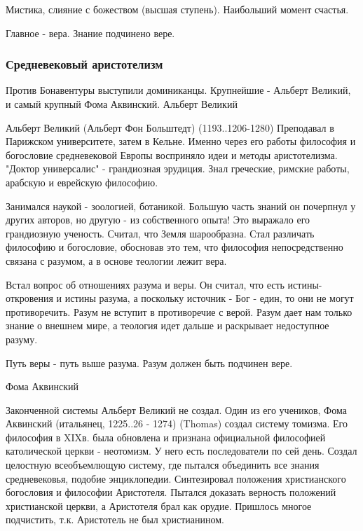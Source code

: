     Мистика, слияние с божеством (высшая ступень). Наибольший момент счастья.

    Главное - вера. Знание подчинено вере.

\subsubsection{Средневековый аристотелизм}

Против Бонавентуры выступили доминиканцы. Крупнейшие - Альберт Великий, и самый крупный Фома Аквинский.
Альберт Великий

Альберт Великий (Альберт Фон Больштедт) (1193..1206-1280) Преподавал в Парижском университете, затем в Кельне. Именно через его работы философия и богословие средневековой Европы восприняло идеи и методы аристотелизма. "Доктор универсалис" - грандиозная эрудиция. Знал греческие, римские работы, арабскую и еврейскую философию.

    Занимался наукой - зоологией, ботаникой. Большую часть знаний он почерпнул у других авторов, но другую - из собственного опыта! Это выражало его грандиозную ученость. Считал, что Земля шарообразна. Стал различать философию и богословие, обосновав это тем, что философия непосредственно связана с разумом, а в основе теологии лежит вера.

Встал вопрос об отношениях разума и веры. Он считал, что есть истины-откровения и истины разума, а поскольку источник - Бог - един, то они не могут противоречить. Разум не вступит в противоречие с верой. Разум дает нам только знание о внешнем мире, а теология идет дальше и раскрывает недоступное разуму.

    Путь веры - путь выше разума. Разум должен быть подчинен вере.

Фома Аквинский

Законченной системы Альберт Великий не создал. Один из его учеников, Фома Аквинский (итальянец, 1225..26 - 1274) (Thomas) создал систему томизма. Его философия в XIXв. была обновлена и признана официальной философией католической церкви - неотомизм. У него есть последователи по сей день. Создал целостную всеобъемлющую систему, где пытался объединить все знания средневековья, подобие энциклопедии. Синтезировал положения христианского богословия и философии Аристотеля. Пытался доказать верность положений христианской церкви, а Аристотеля брал как орудие. Пришлось многое подчистить, т.к. Аристотель не был христианином.

